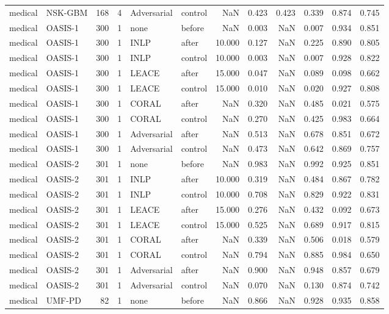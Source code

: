 \begin{tabular}{llrrllrrrrrr}
medical & NSK-GBM & 168 & 4 & Adversarial & control & NaN & 0.423 & 0.423 & 0.339 & 0.874 & 0.745 \\
medical & OASIS-1 & 300 & 1 & none & before & NaN & 0.003 & NaN & 0.007 & 0.934 & 0.851 \\
medical & OASIS-1 & 300 & 1 & INLP & after & 10.000 & 0.127 & NaN & 0.225 & 0.890 & 0.805 \\
medical & OASIS-1 & 300 & 1 & INLP & control & 10.000 & 0.003 & NaN & 0.007 & 0.928 & 0.822 \\
medical & OASIS-1 & 300 & 1 & LEACE & after & 15.000 & 0.047 & NaN & 0.089 & 0.098 & 0.662 \\
medical & OASIS-1 & 300 & 1 & LEACE & control & 15.000 & 0.010 & NaN & 0.020 & 0.927 & 0.808 \\
medical & OASIS-1 & 300 & 1 & CORAL & after & NaN & 0.320 & NaN & 0.485 & 0.021 & 0.575 \\
medical & OASIS-1 & 300 & 1 & CORAL & control & NaN & 0.270 & NaN & 0.425 & 0.983 & 0.664 \\
medical & OASIS-1 & 300 & 1 & Adversarial & after & NaN & 0.513 & NaN & 0.678 & 0.851 & 0.672 \\
medical & OASIS-1 & 300 & 1 & Adversarial & control & NaN & 0.473 & NaN & 0.642 & 0.869 & 0.757 \\
medical & OASIS-2 & 301 & 1 & none & before & NaN & 0.983 & NaN & 0.992 & 0.925 & 0.851 \\
medical & OASIS-2 & 301 & 1 & INLP & after & 10.000 & 0.319 & NaN & 0.484 & 0.867 & 0.782 \\
medical & OASIS-2 & 301 & 1 & INLP & control & 10.000 & 0.708 & NaN & 0.829 & 0.922 & 0.831 \\
medical & OASIS-2 & 301 & 1 & LEACE & after & 15.000 & 0.276 & NaN & 0.432 & 0.092 & 0.673 \\
medical & OASIS-2 & 301 & 1 & LEACE & control & 15.000 & 0.525 & NaN & 0.689 & 0.917 & 0.815 \\
medical & OASIS-2 & 301 & 1 & CORAL & after & NaN & 0.339 & NaN & 0.506 & 0.018 & 0.579 \\
medical & OASIS-2 & 301 & 1 & CORAL & control & NaN & 0.794 & NaN & 0.885 & 0.984 & 0.650 \\
medical & OASIS-2 & 301 & 1 & Adversarial & after & NaN & 0.900 & NaN & 0.948 & 0.857 & 0.679 \\
medical & OASIS-2 & 301 & 1 & Adversarial & control & NaN & 0.070 & NaN & 0.130 & 0.874 & 0.742 \\
medical & UMF-PD & 82 & 1 & none & before & NaN & 0.866 & NaN & 0.928 & 0.935 & 0.858 \\

\end{tabular}
